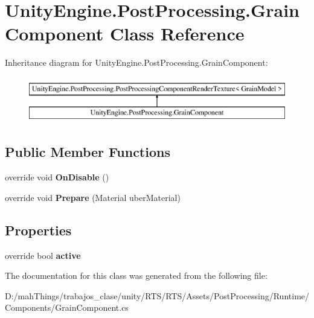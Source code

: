 \hypertarget{class_unity_engine_1_1_post_processing_1_1_grain_component}{}\section{Unity\+Engine.\+Post\+Processing.\+Grain\+Component Class Reference}
\label{class_unity_engine_1_1_post_processing_1_1_grain_component}
Inheritance diagram for Unity\+Engine.\+Post\+Processing.\+Grain\+Component\+:\begin{figure}[H]
\begin{center}
\leavevmode
\includegraphics[height=2.000000cm]{class_unity_engine_1_1_post_processing_1_1_grain_component}
\end{center}
\end{figure}
\subsection*{Public Member Functions}
\begin{DoxyCompactItemize}
\item 
\mbox{\label{class_unity_engine_1_1_post_processing_1_1_grain_component_a345fbfa8ab350022e79fbcae210c3210}} 
override void {\bfseries On\+Disable} ()
\item 
\mbox{\label{class_unity_engine_1_1_post_processing_1_1_grain_component_a6a1c8bf2f8d860c91df6cf012c63c27a}} 
override void {\bfseries Prepare} (Material uber\+Material)
\end{DoxyCompactItemize}
\subsection*{Properties}
\begin{DoxyCompactItemize}
\item 
\mbox{\label{class_unity_engine_1_1_post_processing_1_1_grain_component_adb5baf66470f91776c51124f01acb3e5}} 
override bool {\bfseries active}
\end{DoxyCompactItemize}


The documentation for this class was generated from the following file\+:\begin{DoxyCompactItemize}
\item 
D\+:/mah\+Things/trabajos\+\_\+clase/unity/\+R\+T\+S/\+R\+T\+S/\+Assets/\+Post\+Processing/\+Runtime/\+Components/Grain\+Component.\+cs\end{DoxyCompactItemize}
